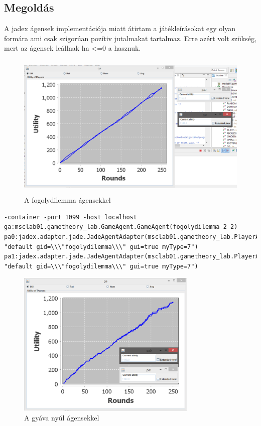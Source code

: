 \subsection{Megoldás}
A jadex ágensek implementációja miatt átirtam a játékleírásokat egy olyan formára ami csak szigorúan pozítiv jutalmakat tartalmaz. Erre azért volt szükség, mert az ágensek leállnak ha <=0 a hasznuk.


		\begin{figure}[h]
		\begin{center}
		\includegraphics[height=7cm]{figures/fogoly_jadex.png}
		\caption{A fogolydilemma ágensekkel}
		\end{center}
		\end{figure}

\begin{lstlisting}[caption=Fogolydilemma run config, frame=single,float=!ht]
-container -port 1099 -host localhost 
ga:msclab01.gametheory_lab.GameAgent.GameAgent(fogolydilemma 2 2) pa0:jadex.adapter.jade.JadeAgentAdapter(msclab01.gametheory_lab.PlayerAgent.Player 
"default gid=\\\"fogolydilemma\\\" gui=true myType=7") 
pa1:jadex.adapter.jade.JadeAgentAdapter(msclab01.gametheory_lab.PlayerAgent.Player 
"default gid=\\\"fogolydilemma\\\" gui=true myType=7")
\end{lstlisting}
		

		\begin{figure}[h]
		\begin{center}
		\includegraphics[height=7cm]{figures/nyul_jadex.png}
		\caption{A gyáva nyúl ágensekkel}
		\end{center}
		\end{figure}

